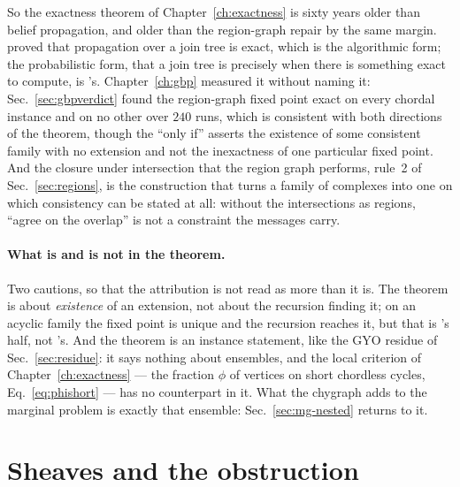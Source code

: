 So the exactness theorem of Chapter~\ref{ch:exactness} is sixty years older
than belief propagation, and older than the region-graph repair by the same
margin. \citet{lauritzen1988} proved that propagation over a join tree is
exact, which is the algorithmic form; the probabilistic form, that a join
tree is precisely when there is something exact to compute, is
\citeauthor{vorobev1962}'s. Chapter~\ref{ch:gbp} measured it without naming
it: Sec.~\ref{sec:gbpverdict} found the region-graph fixed point exact on
every chordal instance and on no other over $240$ runs, which is consistent
with both directions of the theorem, though the ``only if'' asserts the
existence of some consistent family with no extension and not the
inexactness of one particular fixed point. And the closure under intersection that the region
graph performs, rule~2 of Sec.~\ref{sec:regions}, is the construction that
turns a family of complexes into one on which consistency can be stated at
all: without the intersections as regions, ``agree on the overlap'' is not a
constraint the messages carry.

\paragraph{What is and is not in the theorem.} Two cautions, so that the
attribution is not read as more than it is. The theorem is about
\emph{existence} of an extension, not about the recursion finding it; on an
acyclic family the fixed point is unique and the recursion reaches it, but
that is \citeauthor{lauritzen1988}'s half, not \citeauthor{vorobev1962}'s.
And the theorem is an instance statement, like the GYO residue of
Sec.~\ref{sec:residue}: it says nothing about ensembles, and the local
criterion of Chapter~\ref{ch:exactness} --- the fraction $\phi$ of vertices
on short chordless cycles, Eq.~\eqref{eq:phishort} --- has no counterpart in
it. What the chygraph adds to the marginal problem is exactly that
ensemble: Sec.~\ref{sec:mg-nested} returns to it.

\section{Sheaves and the obstruction}
\label{sec:mg-sheaf}

